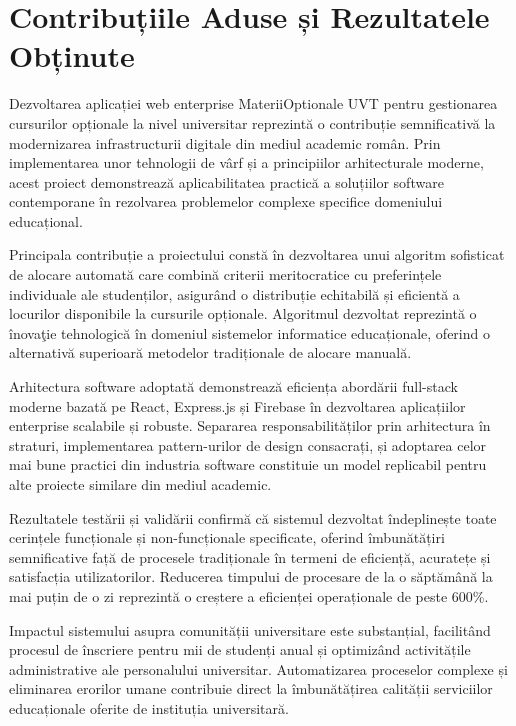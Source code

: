 \documentclass[12pt,a4paper]{report}
\begin{document}
\section{Contribuțiile Aduse și Rezultatele Obținute}

Dezvoltarea aplicației web enterprise MateriiOptionale UVT pentru gestionarea cursurilor opționale la nivel universitar reprezintă o contribuție semnificativă la modernizarea infrastructurii digitale din mediul academic român. Prin implementarea unor tehnologii de vârf și a principiilor arhitecturale moderne, acest proiect demonstrează aplicabilitatea practică a soluțiilor software contemporane în rezolvarea problemelor complexe specifice domeniului educațional.

Principala contribuție a proiectului constă în dezvoltarea unui algoritm sofisticat de alocare automată care combină criterii meritocratice cu preferințele individuale ale studenților, asigurând o distribuție echitabilă și eficientă a locurilor disponibile la cursurile opționale. Algoritmul dezvoltat reprezintă o înovaţie tehnologică în domeniul sistemelor informatice educaționale, oferind o alternativă superioară metodelor tradiționale de alocare manuală.

Arhitectura software adoptată demonstrează eficiența abordării full-stack moderne bazată pe React, Express.js și Firebase în dezvoltarea aplicațiilor enterprise scalabile și robuste. Separarea responsabilităților prin arhitectura în straturi, implementarea pattern-urilor de design consacrați, și adoptarea celor mai bune practici din industria software constituie un model replicabil pentru alte proiecte similare din mediul academic.

Rezultatele testării și validării confirmă că sistemul dezvoltat îndeplinește toate cerințele funcționale și non-funcționale specificate, oferind îmbunătățiri semnificative față de procesele tradiționale în termeni de eficiență, acuratețe și satisfacția utilizatorilor. Reducerea timpului de procesare de la o săptămână la mai puțin de o zi reprezintă o creștere a eficienței operaționale de peste 600\%.

Impactul sistemului asupra comunității universitare este substanțial, facilitând procesul de înscriere pentru mii de studenți anual și optimizând activitățile administrative ale personalului universitar. Automatizarea proceselor complexe și eliminarea erorilor umane contribuie direct la îmbunătățirea calității serviciilor educaționale oferite de instituția universitară.
\end{document}
